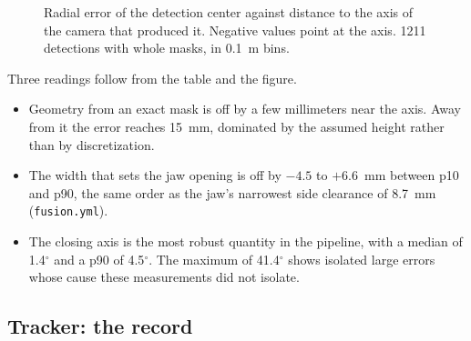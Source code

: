 \documentclass[11pt,a4paper]{article}
\theoremstyle{definition}
\theoremstyle{remark}
\newcommand{\code}[1]{\texttt{#1}}
\begin{document}
\begin{figure}[ht]
\centering
{}
\caption{Radial error of the detection center against distance to the axis of
the camera that produced it. Negative values point at the axis. 1211 detections
with whole masks, in 0.1~m bins.}
\label{fig:radial}
\end{figure}

Three readings follow from the table and the figure.
\begin{itemize}[leftmargin=*]
\item Geometry from an exact mask is off by a few millimeters near the axis.
  Away from it the error reaches 15~mm, dominated by the assumed height rather
  than by discretization.
\item The width that sets the jaw opening is off by $-4.5$ to $+6.6$~mm between
  p10 and p90, the same order as the jaw's narrowest side clearance of 8.7~mm
  (\code{fusion.yml}).
\item The closing axis is the most robust quantity in the pipeline, with a
  median of 1.4$^\circ$ and a p90 of 4.5$^\circ$. The maximum of 41.4$^\circ$
  shows isolated large errors whose cause these measurements did not isolate.
\end{itemize}

\subsection{Tracker: the record}
\end{document}
